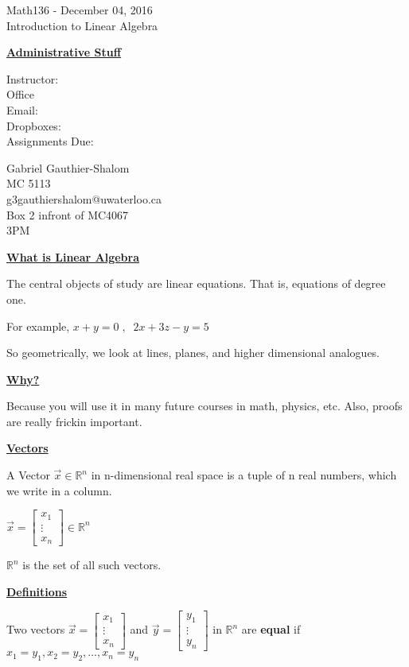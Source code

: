 \documentclass{letter}
\begin{document}
	\begin{center}
		\LARGE Math136 - December 04, 2016\\
		\large Introduction to Linear Algebra
	\end{center}
	\vspace{0.25 in}
	\underline{\textbf{Administrative Stuff}}
	
		\begin{minipage}[t]{0.2\textwidth}
			Instructor: \\
			Office\\
			Email:\\
			Dropboxes:\\
			Assignments Due:
		\end{minipage}
		\begin{minipage}[t]{0.8\textwidth}
			Gabriel Gauthier-Shalom\\
			MC 5113\\
			g3gauthiershalom@uwaterloo.ca\\
			Box 2 infront of MC4067\\
			3PM
		\end{minipage}
		
	\underline{\textbf{What is Linear Algebra}}
	
	The central objects of study are linear equations. That is, equations of degree one.

	For example, $x+y=0\;,\;\; 2x+3z-y = 5$
	
	So geometrically, we look at lines, planes, and higher dimensional analogues.
	
	\underline{\textbf{Why?}}
	
	Because you will use it in many future courses in math, physics, etc. Also, proofs are really frickin important.
	
	\underline{\textbf{Vectors}}
	
	A Vector $\vec x \in \mathbb{R}^n$ in n-dimensional real space is a tuple of n real numbers, which we write in a column.
	
	$\vec x = \begin{bmatrix}
		x_1\\
		\vdots\\
		x_n
	\end{bmatrix} \in \mathbb{R}^n$
	
	$\mathbb{R}^n$ is the set of all such vectors.
	
	\underline{\textbf{Definitions}}
	
	Two vectors $\vec x = \begin{bmatrix}x_1\\\vdots\\x_n\end{bmatrix}$ and $\vec y = \begin{bmatrix}y_1\\\vdots\\y_n\end{bmatrix}$ in $\mathbb{R}^n$ are \textbf{equal} if $x_1 = y_1, x_2 = y_2, \dots, x_n = y_n$
	
\end{document}
